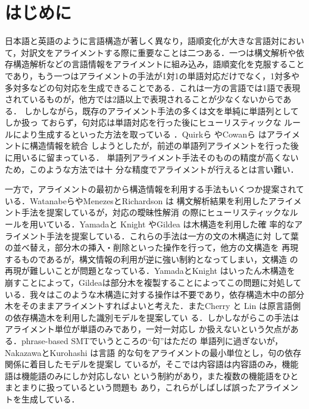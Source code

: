 \documentclass[japanese]{jnlp_1.4}
\begin{document}
\maketitle



\section{はじめに}
\label{Introduction}

日本語と英語のように言語構造が著しく異なり，語順変化が大きな言語対におい
て，対訳文をアライメントする際に重要なことは二つある．一つは構文解析や依
存構造解析などの言語情報をアライメントに組み込み，語順変化を克服すること
であり，もう一つはアライメントの手法が1対1の単語対応だけでなく，1対多や
多対多などの句対応を生成できることである．これは一方の言語では1語で表現
されているものが，他方では2語以上で表現されることが少なくないからである．
しかしながら，既存のアライメント手法の多くは文を単純に単語列としてしか扱っ
ておらず\cite{Brown93}，句対応は単語対応を行った後にヒューリスティックな
ルールにより生成するといった方法を取っている
\cite{koehn-och-marcu:2003:HLTNAACL}．Quirkら
\cite{quirk-menezes-cherry:2005:ACL}やCowanら
\cite{cowan-kuucerova-collins:2006:EMNLP}はアライメントに構造情報を統合
しようとしたが，前述の単語列アライメントを行った後に用いるに留まっている．
単語列アライメント手法そのものの精度が高くないため，このような方法では十
分な精度でアライメントが行えるとは言い難い．


一方で，アライメントの最初から構造情報を利用する手法もいくつか提案されて
いる．Wata\-nabeら\cite{Watanabe00}やMenezesとRichardson \cite{Menezes01}は
構文解析結果を利用したアライメント手法を提案しているが，対応の曖昧性解消
の際にヒューリスティックなルールを用いている．Yamadaと
Knight \cite{yamada_ACL_2001}やGildea \cite{Gildea03} は木構造を利用した確
率的なアライメント手法を提案している．これらの手法は一方の文の木構造に対
して葉の並べ替え，部分木の挿入・削除といった操作を行って，他方の文構造を
再現するものであるが，構文情報の利用が逆に強い制約となってしまい，文構造
の再現が難しいことが問題となっている．YamadaとKnight はいったん木構造を
崩すことによって，Gildeaは部分木を複製することによってこの問題に対処して
いる．我々はこのような木構造に対する操作は不要であり，依存構造木中の部分
木をそのままアライメントすればよいと考えた．またCherry と
Lin \cite{Cherry03}は原言語側の依存構造木を利用した識別モデルを提案してい
る．しかしながらこの手法はアライメント単位が単語のみであり，一対一対応し
か扱えないという欠点がある．phrase-based SMTでいうところの“句”はただの
単語列に過ぎないが，NakazawaとKurohashi \cite{nakazawa:2008:AMTA} は言語
的な句をアライメントの最小単位とし，句の依存関係に着目したモデルを提案し
ているが，そこでは内容語は内容語のみ，機能語は機能語のみにしか対応しない
という制約があり，また複数の機能語をひとまとまりに扱っているという問題も
あり，これらがしばしば誤ったアライメントを生成している．
\end{document}

